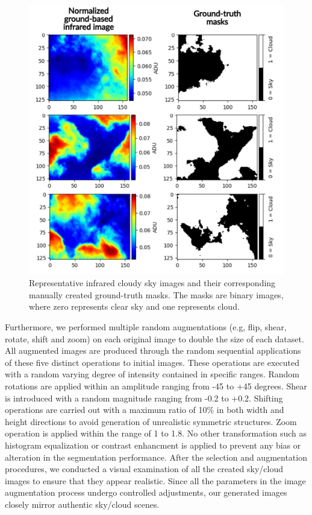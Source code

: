\documentclass[amt, article]{copernicus}
\begin{document}
\begin{figure}[t]
	\includegraphics[width=\hsize]{figures/cloud_images_ground_truth.pdf}
	\caption{Representative infrared cloudy sky images and their corresponding manually created ground-truth masks. The masks are binary images, where zero represents clear sky and one represents cloud.}
    \label{fig:cloud_images_ground_truth}
\end{figure}

Furthermore, we performed multiple random augmentations (e.g, flip, shear, rotate, shift and zoom) on each original image to double the size of each dataset. All augmented images are produced through the random sequential applications of these five distinct operations to initial images.
These operations are executed with a random varying degree of intensity contained in specific ranges. Random rotations are applied within an amplitude ranging from -45 to +45 degrees. Shear is introduced with a random magnitude ranging from -0.2 to +0.2. Shifting operations are carried out with a maximum ratio of 10\% in both width and height directions to avoid generation of unrealistic symmetric structures. Zoom operation is applied within the range of 1 to 1.8. No other transformation such as histogram equalization or contrast enhancment is applied to prevent any bias or alteration in the segmentation performance. After the selection and augmentation procedures, we conducted a visual examination of all the created sky/cloud images to ensure that they appear realistic. Since all the parameters in the image augmentation process undergo controlled adjustments, our generated images closely mirror authentic sky/cloud scenes.
\end{document}
